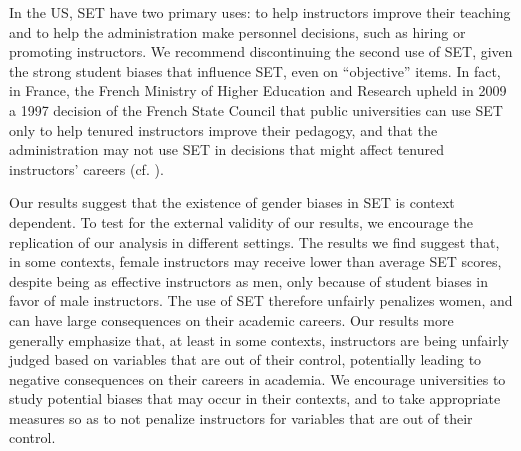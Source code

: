 \documentclass[12pt]{article}
\begin{document}
In the US, SET have two primary uses: 
to help instructors improve their teaching and to help the administration make personnel decisions, such as
hiring or promoting instructors. 
We recommend discontinuing the second use of SET, given the strong student biases that 
influence SET, even on ``objective'' items. 
In fact, in France, the French Ministry of Higher Education and Research upheld in 2009 a 1997 decision of the French State Council that public universities can use SET only to help tenured instructors improve their pedagogy, and that the administration may not  use SET in decisions that might affect 
tenured instructors' careers (cf. \citet{Boring2015ofce}). 

Our results suggest that the existence of gender biases in SET is context dependent. 
To test for the external validity of our results, we encourage the replication of our analysis in different settings. The results we find suggest that, in some contexts, female instructors may receive lower than average SET scores, despite being as effective instructors as men, only because of student biases in favor of male instructors. The use of SET therefore unfairly penalizes women, and can have large consequences on their academic careers. Our results more generally emphasize that, at least in some contexts, instructors are being unfairly judged based on variables that are out of their control, potentially leading to negative consequences on their careers in academia. We encourage universities to study potential biases that may occur in their contexts, and to take appropriate measures so as to not penalize instructors for variables that are out of their control.
 



\end{document}
